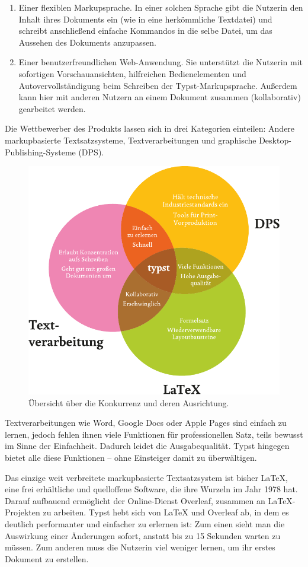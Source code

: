 \documentclass[11pt, a4paper]{article}
\newcommand{\gender}{\raisebox{-.25em}{*}}
\renewcommand{\glossary} {\marginsymbol{\textbf{↪}}}
\newcommand{\marginsymbol}[1] {\protect\marginsymbolhelper{#1}}
\newcommand{\marginsymbolhelper}[1] {\tabto*{-1cm}\makebox[0cm]{#1}\tabto*{\TabPrevPos}}
\begin{document}
\begin{enumerate}
    \item Einer flexiblen \glossary Markupsprache. In einer solchen Sprache gibt die\gender{} Nutzer\gender{}in den Inhalt ihres\gender{} Dokuments ein (wie in eine herkömmliche Textdatei) und schreibt anschließend einfache Kommandos in die selbe Datei, um das Aussehen des Dokuments anzupassen.
    \item Einer benutzerfreundlichen Web-Anwendung. Sie unterstützt die\gender{} Nutzer\gender{}in mit sofortigen Vorschauansichten, hilfreichen Bedienelementen und Autovervollständigung beim Schreiben der Typst-Markupsprache. Außerdem kann hier mit anderen Nutzern an einem Dokument zusammen (kollaborativ) gearbeitet werden.
\end{enumerate}

Die Wettbewerber des Produkts lassen sich in drei Kategorien einteilen: Andere markupbasierte Textsatzsysteme, Textverarbeitungen und graphische Desktop-Publishing-Systeme (DPS).

\begin{figure}[h]
    \centering
    \includegraphics[width=.5\textwidth]{../assets/venn.pdf}
    \caption{Übersicht über die Konkurrenz und deren Ausrichtung.}
\end{figure}

Textverarbeitungen wie Word, Google Docs oder Apple Pages sind einfach zu lernen, jedoch fehlen ihnen viele Funktionen für professionellen Satz, teils bewusst im Sinne der Einfachheit. Dadurch leidet die Ausgabequalität. Typst hingegen bietet alle diese Funktionen -- ohne Einsteiger damit zu überwältigen.

Das einzige weit verbreitete markupbasierte Textsatzsystem ist bisher LaTeX, eine frei erhältliche und quelloffene Software, die ihre Wurzeln im Jahr 1978 hat. Darauf aufbauend ermöglicht der Online-Dienst Overleaf, zusammen an LaTeX-Projekten zu arbeiten. Typst hebt sich von LaTeX und Overleaf ab, in dem es deutlich performanter und einfacher zu erlernen ist: Zum einen sieht man die Auswirkung einer Änderungen sofort, anstatt bis zu 15 Sekunden warten zu müssen. Zum anderen muss die\gender{} Nutzer\gender{}in viel weniger lernen, um ihr\gender{} erstes Dokument zu erstellen.
\end{document}
